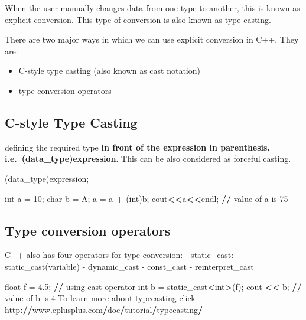 \documentclass[
]{article}
\newenvironment{Shaded}{\begin{snugshade}}{\end{snugshade}}
\newcommand{\DecValTok}[1]{\textcolor[rgb]{0.00,0.00,0.81}{#1}}
\newcommand{\ErrorTok}[1]{\textcolor[rgb]{0.64,0.00,0.00}{\textbf{#1}}}
\newcommand{\FloatTok}[1]{\textcolor[rgb]{0.00,0.00,0.81}{#1}}
\newcommand{\NormalTok}[1]{#1}
\newcommand{\OtherTok}[1]{\textcolor[rgb]{0.56,0.35,0.01}{#1}}
\newcommand{\SpecialCharTok}[1]{\textcolor[rgb]{0.81,0.36,0.00}{\textbf{#1}}}
\newcommand{\StringTok}[1]{\textcolor[rgb]{0.31,0.60,0.02}{#1}}
\providecommand{\tightlist}{%
  \setlength{\itemsep}{0pt}\setlength{\parskip}{0pt}}
\begin{document}
When the user manually changes data from one type to another, this is
known as explicit conversion. This type of conversion is also known as
type casting.

There are two major ways in which we can use explicit conversion in C++.
They are:

\begin{itemize}
\tightlist
\item
  C-style type casting (also known as cast notation)
\item
  type conversion operators
\end{itemize}

\subsection{C-style Type Casting}\label{c-style-type-casting}

defining the required type \textbf{in front of the expression in
parenthesis, i.e.~(data\_type)expression}. This can be also considered
as forceful casting.

(data\_type)expression;

\begin{Shaded}
\begin{Highlighting}[]
\NormalTok{int a }\OtherTok{=} \DecValTok{10}\NormalTok{;}
\NormalTok{char b }\OtherTok{=} \StringTok{\textquotesingle{}A\textquotesingle{}}\NormalTok{;}
\NormalTok{a }\OtherTok{=}\NormalTok{ a }\SpecialCharTok{+}\NormalTok{ (int)b;}
\NormalTok{cout}\SpecialCharTok{\textless{}}\ErrorTok{\textless{}}\NormalTok{a}\SpecialCharTok{\textless{}}\ErrorTok{\textless{}}\NormalTok{endl;}
\SpecialCharTok{/}\ErrorTok{/}\NormalTok{ value of a is }\DecValTok{75}
\end{Highlighting}
\end{Shaded}

\subsection{Type conversion operators}\label{type-conversion-operators}

C++ also has four operators for type conversion: - static\_cast:
static\_cast(variable) - dynamic\_cast - const\_cast - reinterpret\_cast

\begin{Shaded}
\begin{Highlighting}[]
\NormalTok{float f }\OtherTok{=} \FloatTok{4.5}\NormalTok{;   }
\SpecialCharTok{/}\ErrorTok{/}\NormalTok{ using cast operator }
\NormalTok{int b }\OtherTok{=}\NormalTok{ static\_cast}\SpecialCharTok{\textless{}}\NormalTok{int}\SpecialCharTok{\textgreater{}}\NormalTok{(f); }
\NormalTok{cout }\SpecialCharTok{\textless{}}\ErrorTok{\textless{}}\NormalTok{ b; }
\SpecialCharTok{/}\ErrorTok{/}\NormalTok{ value of b is }\DecValTok{4}
\NormalTok{To learn more about typecasting click http}\SpecialCharTok{:}\ErrorTok{//}\NormalTok{www.cplusplus.com}\SpecialCharTok{/}\NormalTok{doc}\SpecialCharTok{/}\NormalTok{tutorial}\SpecialCharTok{/}\NormalTok{typecasting}\SpecialCharTok{/}
\end{Highlighting}
\end{Shaded}
\end{document}
